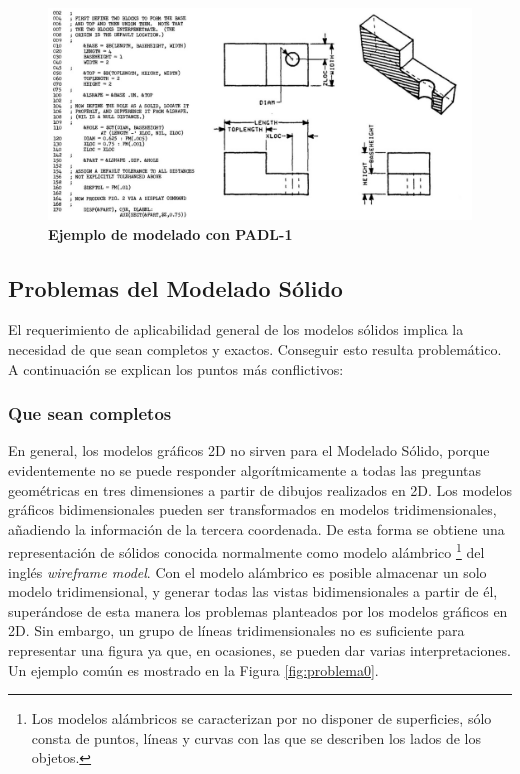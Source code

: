 \begin{figure}[h]
\includegraphics[width=16cm]{Img/GEO/geo-padl.jpg}
\centering
\caption{\textbf{\footnotesize{Ejemplo de modelado con PADL-1}}}
\end{figure}

\clearpage
\subsection{ Problemas del Modelado Sólido }
\label{sectionproblema}

El requerimiento de aplicabilidad general de los modelos sólidos implica la necesidad de que sean completos y exactos. Conseguir esto resulta problemático.
A continuación se explican los puntos más conflictivos: 

\subsubsection{Que sean completos}

En general, los modelos gráficos 2D no sirven para el Modelado Sólido, porque evidentemente no se puede responder algorítmicamente a todas las preguntas geométricas en tres dimensiones a partir de dibujos realizados en 2D.
Los modelos gráficos bidimensionales pueden ser transformados en modelos tridimensionales, añadiendo la información de la tercera coordenada.
De esta forma se obtiene una representación de sólidos conocida normalmente como modelo alámbrico \footnote{Los modelos alámbricos se caracterizan por no disponer de superficies, sólo consta de puntos, líneas y curvas con las que se describen los lados de los objetos.} del inglés \textit{wireframe model}. Con el modelo alámbrico es posible almacenar un solo modelo tridimensional, y generar todas las vistas bidimensionales a partir de él, superándose de esta manera los problemas planteados por los modelos gráficos en 2D.
Sin embargo, un grupo de líneas tridimensionales no es suficiente para representar una figura ya que, en ocasiones, se pueden dar varias interpretaciones.
Un ejemplo común es mostrado en la Figura \ref{fig:problema0}.

